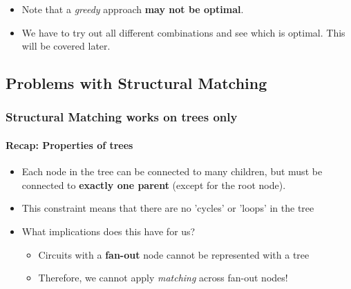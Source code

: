 \documentclass{article}
\begin{document}
\begin{itemize}
    \item Note that a \textit{greedy} approach \textbf{may not be optimal}.
    \item We have to try out all different combinations and see which is optimal. This will be covered later.
\end{itemize}

\subsection{Problems with Structural Matching}
\subsubsection{Structural Matching works on trees only}

\paragraph{Recap: Properties of trees}\mbox{}
\begin{itemize}
    \item Each node in the tree can be connected to many children, but must be connected to \textbf{exactly one parent} (except for the root node).
    \item This constraint means that there are no 'cycles' or 'loops' in the tree
    \item What implications does this have for us?
        \begin{itemize}
            \item Circuits with a \textbf{fan-out} node cannot be represented with a tree
            \item Therefore, we cannot apply \textit{matching} across fan-out nodes!
        \end{itemize}
\end{itemize}
\end{document}
